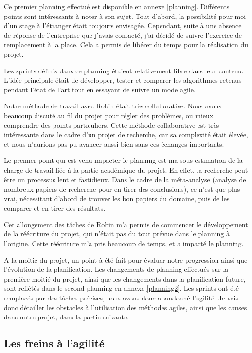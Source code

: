 \documentclass[openany, 11pt]{memoir}
\begin{document}
Ce premier planning effectué est disponible en annexe \ref{planning}. Différents points sont intéressants à noter à son sujet. Tout d'abord, la possibilité pour moi d'un stage à l'étranger était toujours envisagée. Cependant, suite à une absence de réponse de l'entreprise que j'avais contacté, j'ai décidé de suivre l'exercice de remplacement à la place. Cela a permis de libérer du temps pour la réalisation du projet.

Les sprints définis dans ce planning étaient relativement libre dans leur contenu. L'idée principale était de développer, tester et comparer les algorithmes retenus pendant l'état de l'art tout en essayant de suivre un mode agile.

\bigskip
Notre méthode de travail avec Robin était très collaborative. Nous avons beaucoup discuté au fil du projet pour régler des problèmes, ou mieux comprendre des points particuliers. Cette méthode collaborative est très intéressante dans le cadre d'un projet de recherche, car sa complexité était élevée, et nous n'aurions pas pu avancer aussi bien sans ces échanges importants.

\bigskip
Le premier point qui est venu impacter le planning est ma sous-estimation de la charge de travail liée à la partie académique du projet. En effet, la recherche peut être un processus lent et fastidieux. Dans le cadre de la méta-analyse (analyse de nombreux papiers de recherche pour en tirer des conclusions), ce n'est que plus vrai, nécessitant d'abord de trouver les bon papiers du domaine, puis de les comparer et en tirer des résultats.

Cet allongement des tâches de Robin m'a permis de commencer le développement de la réécriture du projet, qui n'était pas du tout prévue dans le planning à l'origine. Cette réécriture m'a pris beaucoup de temps, et a impacté le planning.

\bigskip
A la moitié du projet, un point à été fait pour évaluer notre progression ainsi que l'évolution de la planification. Les changements de planning effectués sur la première moitié du projet, ainsi que les changements dans la planification future, sont reflétés dans le second planning en annexe \ref{planning2}. Les sprints ont été remplacés par des tâches précises, nous avons donc abandonné l'agilité. Je vais donc détailler les obstacles à l'utilisation des méthodes agiles, ainsi que les causes dans notre projet, dans la partie suivante.

\subsection{Les freins à l'agilité}
\end{document}
